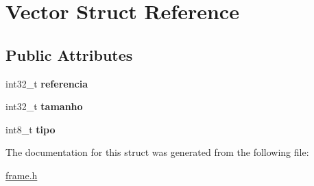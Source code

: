 \hypertarget{structVector}{}\section{Vector Struct Reference}
\label{structVector}
\subsection*{Public Attributes}
\begin{DoxyCompactItemize}
\item 
\mbox{\label{structVector_a0f2af0912b4d39a569c01fc73c409b0f}} 
int32\+\_\+t {\bfseries referencia}
\item 
\mbox{\label{structVector_a7444f49069adbd72108bda57a0585476}} 
int32\+\_\+t {\bfseries tamanho}
\item 
\mbox{\label{structVector_a7dfc8127c1b5681c6b4ccd3c036710e7}} 
int8\+\_\+t {\bfseries tipo}
\end{DoxyCompactItemize}


The documentation for this struct was generated from the following file\+:\begin{DoxyCompactItemize}
\item 
\hyperlink{frame_8h}{frame.\+h}\end{DoxyCompactItemize}
